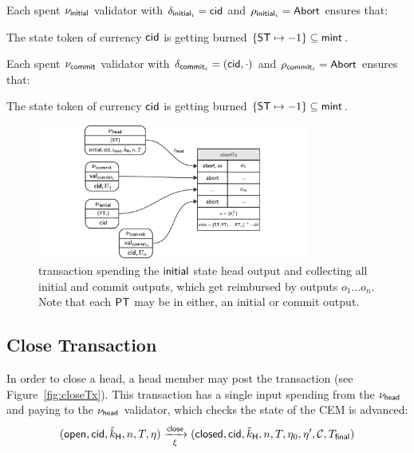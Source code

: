 \noindent Each spent $\nu_{\mathsf{initial}}$ validator with $\delta_{\mathsf{initial}_{i}} = \mathsf{cid}$ and $\rho_{\mathsf{initial}_{i}} = \mathsf{Abort}$ ensures that:
\begin{menumerate}
	\item The state token of currency $\mathsf{cid}$ is getting burned $\{\mathsf{ST} \mapsto -1\} \subseteq \mathsf{mint}$.
\end{menumerate}

\noindent Each spent $\nu_{\mathsf{commit}}$ validator with $\delta_{\mathsf{commit}_{i}} = (\mathsf{cid},\cdot)$ and $\rho_{\mathsf{commit}_{i}} = \mathsf{Abort}$ ensures that:
\begin{menumerate}
	\item The state token of currency $\mathsf{cid}$ is getting burned $\{\mathsf{ST} \mapsto -1\} \subseteq \mathsf{mint}$.
\end{menumerate}

\begin{figure}[h]
	\centering
	\includegraphics[width=0.8\textwidth]{figures/abortTx.pdf}
	\caption{\mtxAbort{} transaction spending the $\mathsf{initial}$ state head
		output and collecting all initial and commit outputs, which get reimbursed
		by outputs $o_{1} \dots o_{n}$. Note that each $\mathsf{PT}$ may be in either, an
		initial or commit output.}\label{fig:abortTx}
\end{figure}

\subsection{Close Transaction}\label{sec:close-tx}

In order to close a head, a head member may post the \mtxClose{} transaction
(see Figure~\ref{fig:closeTx}). This transaction has a single input
spending from the $\nu_\mathsf{head}$ and paying to the $\nu_\mathsf{head}$ validator, which checks
the state of the CEM is advanced:
\[
	(\mathsf{open},\mathsf{cid},\tilde{k}_{\mathsf{H}},n,T,\eta) \xrightarrow[\xi]{\mathsf{close}} (\mathsf{closed},\mathsf{cid},\tilde{k}_{\mathsf{H}},n,T,\eta_0,\eta',\mathcal{C},T_{\mathsf{final}})
\]

